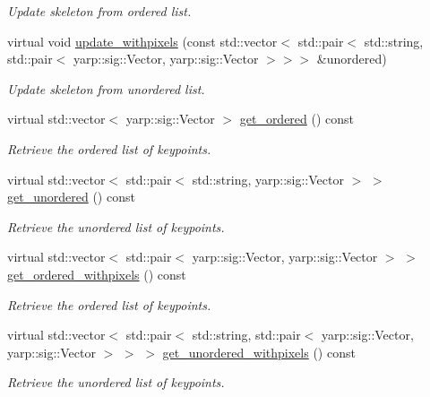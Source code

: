 \begin{DoxyCompactItemize}
\begin{DoxyCompactList}\small\item\em Update skeleton from ordered list. \end{DoxyCompactList}\item 
virtual void \hyperlink{classassistive__rehab_1_1Skeleton_a36e9dfd4910120025e40ccc3d03c0e01}{update\+\_\+withpixels} (const std\+::vector$<$ std\+::pair$<$ std\+::string, std\+::pair$<$ yarp\+::sig\+::\+Vector, yarp\+::sig\+::\+Vector $>$$>$$>$ \&unordered)
\begin{DoxyCompactList}\small\item\em Update skeleton from unordered list. \end{DoxyCompactList}\item 
virtual std\+::vector$<$ yarp\+::sig\+::\+Vector $>$ \hyperlink{classassistive__rehab_1_1Skeleton_a9c56f7f9e243ae2c4c3fef6dbb051dc2}{get\+\_\+ordered} () const
\begin{DoxyCompactList}\small\item\em Retrieve the ordered list of keypoints. \end{DoxyCompactList}\item 
virtual std\+::vector$<$ std\+::pair$<$ std\+::string, yarp\+::sig\+::\+Vector $>$ $>$ \hyperlink{classassistive__rehab_1_1Skeleton_a7b9f01b2b0f5450920335347c5861a2f}{get\+\_\+unordered} () const
\begin{DoxyCompactList}\small\item\em Retrieve the unordered list of keypoints. \end{DoxyCompactList}\item 
virtual std\+::vector$<$ std\+::pair$<$ yarp\+::sig\+::\+Vector, yarp\+::sig\+::\+Vector $>$ $>$ \hyperlink{classassistive__rehab_1_1Skeleton_a270506cde494cb4261c7892edb46ce53}{get\+\_\+ordered\+\_\+withpixels} () const
\begin{DoxyCompactList}\small\item\em Retrieve the ordered list of keypoints. \end{DoxyCompactList}\item 
virtual std\+::vector$<$ std\+::pair$<$ std\+::string, std\+::pair$<$ yarp\+::sig\+::\+Vector, yarp\+::sig\+::\+Vector $>$ $>$ $>$ \hyperlink{classassistive__rehab_1_1Skeleton_a513a3dc56d55a7b10b256378ae63c6c7}{get\+\_\+unordered\+\_\+withpixels} () const
\begin{DoxyCompactList}\small\item\em Retrieve the unordered list of keypoints. \end{DoxyCompactList}\item 

\end{DoxyCompactItemize}
